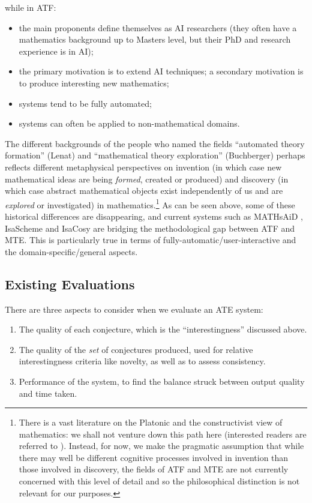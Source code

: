while in ATF:

\begin{itemize}
\item the main proponents define themselves as AI researchers (they
  often have a mathematics background up to Masters level, but their
  PhD and research experience is in AI);
\item the primary motivation is to extend AI techniques; a secondary
  motivation is to produce interesting new mathematics;
\item systems tend to be fully automated;
\item systems can often be applied to non-mathematical domains.
\end{itemize}

The different backgrounds of the people who named the fields
``automated theory formation'' (Lenat) and ``mathematical theory
exploration'' (Buchberger) perhaps reflects different metaphysical
perspectives on invention (in which case new mathematical ideas are
being {\em formed}, created or produced) and discovery (in which case
abstract mathematical objects exist independently of us and are {\em
  explored} or investigated) in mathematics.\footnote{There is a vast
  literature on the Platonic and the constructivist view of
  mathematics: we shall not venture down this path here (interested
  readers are referred to \cite{hersh:97,shapiro}). Instead, for now,
  we make the pragmatic assumption that while there may well be
  different cognitive processes involved in invention than those
  involved in discovery, the fields of ATF and MTE are not currently
  concerned with this level of detail and so the philosophical
  distinction is not relevant for our purposes.} As can be seen above,
some of these historical differences are disappearing, and current
systems such as MATHsAiD \cite{roy}, IsaScheme \cite{MontanoRivas2011}
and IsaCosy \cite{johansson} are bridging the methodological gap
between ATF and MTE. This is particularly true in terms of
fully-automatic/user-interactive and the domain-specific/general
aspects.

\subsection{Existing Evaluations}
\label{sec:existing}

There are three aspects to consider when we evaluate an ATE system:

\begin{enumerate}
\item The quality of each conjecture, which is the ``interestingness'' discussed
  above.
\item The quality of the \emph{set} of conjectures produced, used for relative
  interestingness criteria like novelty, as well as to assess consistency.
\item Performance of the system, to find the balance struck between output
  quality and time taken.
\end{enumerate}

